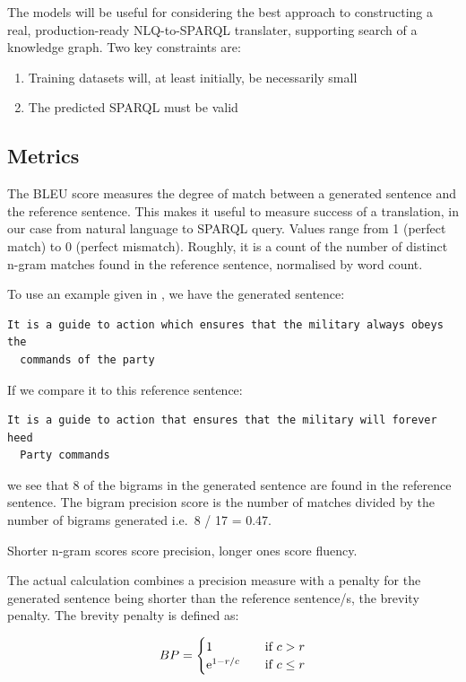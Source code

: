 \documentclass[12pt]{article}
\begin{document}
The models will be useful for considering the best approach to 
constructing a real, production-ready NLQ-to-SPARQL translater, supporting
search of a knowledge graph. Two key constraints are:
\begin{enumerate}
  \item Training datasets will, at least initially, be necessarily small
  \item The predicted SPARQL must be valid
\end{enumerate}

\subsection{Metrics}\label{metrics}

The BLEU score measures the degree of match between a generated sentence
and the reference sentence. This makes it useful to measure success of a
translation, in our case from natural language to SPARQL query. Values
range from 1 (perfect match) to 0 (perfect mismatch). Roughly, it is a
count of the number of distinct n-gram matches found in the reference
sentence, normalised by word count.

To use an example given in \cite{papineni2002bleu}, we have the
generated sentence:
  
\begin{lstlisting}[]
  It is a guide to action which ensures that the military always obeys the
  commands of the party
\end{lstlisting}

If we compare it to this reference sentence:

\begin{lstlisting}[]
  It is a guide to action that ensures that the military will forever heed
  Party commands
\end{lstlisting}

we see that 8 of the bigrams in the generated sentence are found in the
reference sentence. The bigram precision score is the number of matches
divided by the number of bigrams generated i.e.~8 / 17 = 0.47.

Shorter n-gram scores score precision, longer ones score fluency.

The actual calculation combines a precision measure with a penalty for 
the generated sentence being shorter than the reference sentence/s, the
brevity penalty. The brevity penalty is defined as:

\[ BP =
  \begin{cases}
    1               & \quad \text{if } c > r\\
    {\rm e}^{1-r/c} & \quad \text{if } c \leq r
  \end{cases}
\]
\end{document}
